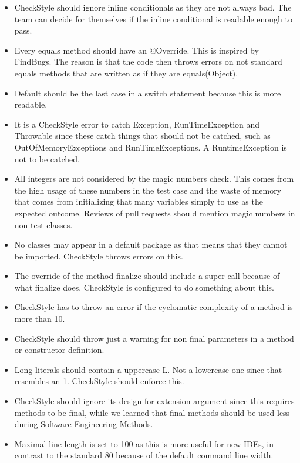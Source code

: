 \documentclass[11pt,a4paper]{report}
\begin{document}
\begin{itemize}

\item CheckStyle should ignore inline conditionals as they are not always bad. The team can decide for themselves if the inline conditional is readable enough to pass.

\item Every equals method should have an @Override. This is inspired by FindBugs. The reason is that the code then throws errors on not standard equals methods that are written as if they are equals(Object).

\item Default should be the last case in a switch statement because this is more readable.

\item It is a CheckStyle error to catch Exception, RunTimeException and Throwable since these catch things that should not be catched, such as OutOfMemoryExceptions and RunTimeExceptions. A RuntimeException is not to be catched.

\item All integers are not considered by the magic numbers check. This comes from the high usage of these numbers in the test case and the waste of memory that comes from initializing that many variables simply to use as the expected outcome. Reviews of pull requests should mention magic numbers in non test classes.

\item No classes may appear in a default package as that means that they cannot be imported. CheckStyle throws errors on this.

\item The override of the method finalize should include a super call because of what finalize does. CheckStyle is configured to do something about this.

\item CheckStyle has to throw an error if the cyclomatic complexity of a method is more than 10.

\item CheckStyle should throw just a warning for non final parameters in a method or constructor definition.

\item Long literals should contain a uppercase L. Not a lowercase one since that resembles an 1. CheckStyle should enforce this.

\item CheckStyle should ignore its design for extension argument since this requires methods to be final, while we learned that final methods should be used less during Software Engineering Methods.

\item Maximal line length is set to 100 as this is more useful for new IDEs, in contrast to the standard 80 because of the default command line width.

\end{itemize}
\end{document}
